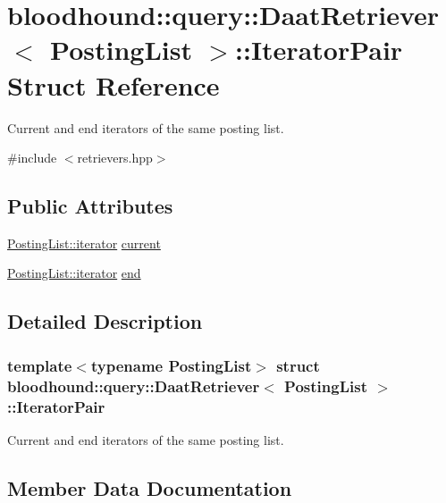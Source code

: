 \hypertarget{structbloodhound_1_1query_1_1DaatRetriever_1_1IteratorPair}{}\section{bloodhound\+:\+:query\+:\+:Daat\+Retriever$<$ Posting\+List $>$\+:\+:Iterator\+Pair Struct Reference}
\label{structbloodhound_1_1query_1_1DaatRetriever_1_1IteratorPair}


Current and end iterators of the same posting list.  




{\ttfamily \#include $<$retrievers.\+hpp$>$}

\subsection*{Public Attributes}
\begin{DoxyCompactItemize}
\item 
\mbox{\hyperlink{structbloodhound_1_1PostingList_1_1iterator}{Posting\+List\+::iterator}} \mbox{\hyperlink{structbloodhound_1_1query_1_1DaatRetriever_1_1IteratorPair_a39776930389d36b2b0da49c3b5685ec4}{current}}
\item 
\mbox{\hyperlink{structbloodhound_1_1PostingList_1_1iterator}{Posting\+List\+::iterator}} \mbox{\hyperlink{structbloodhound_1_1query_1_1DaatRetriever_1_1IteratorPair_af2205effb4b97e6351c3d32c034342c2}{end}}
\end{DoxyCompactItemize}


\subsection{Detailed Description}
\subsubsection*{template$<$typename Posting\+List$>$\newline
struct bloodhound\+::query\+::\+Daat\+Retriever$<$ Posting\+List $>$\+::\+Iterator\+Pair}

Current and end iterators of the same posting list. 

\subsection{Member Data Documentation}
\mbox{\label{structbloodhound_1_1query_1_1DaatRetriever_1_1IteratorPair_a39776930389d36b2b0da49c3b5685ec4}} 
